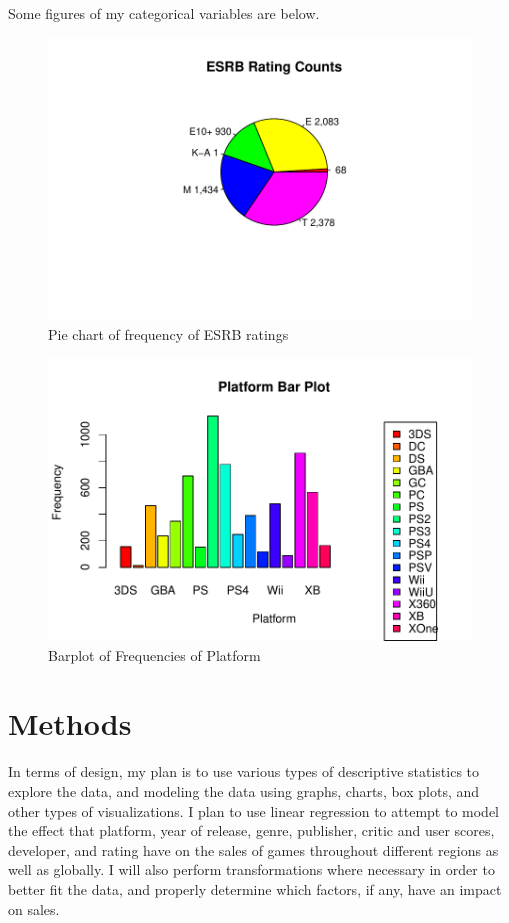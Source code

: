 \documentclass[12pt]{article}
\begin{document}
Some figures of my categorical variables are below.

\begin{figure}[tbp]
  \centering
  \includegraphics[width=\textwidth]{ESRBv2.pdf}
  \caption{Pie chart of frequency of ESRB ratings}
  \label{fig:ESRB}
\end{figure}

\begin{figure}[tbp]
  \centering
  \includegraphics[width=\textwidth]{platformbarplot.pdf}
  \caption{Barplot of Frequencies of Platform}
  \label{fig:platbar}
\end{figure}



\section{Methods}
\label{sec:meth}
In terms of design, my plan is to use various types of descriptive statistics to explore the data, and modeling the data using graphs, 
charts, box plots, and other types of visualizations. I plan to use linear regression to attempt to model the effect that platform, 
year of release, genre, publisher, critic and user scores, developer, and rating have on the sales of games throughout different regions 
as well as globally. I will also perform transformations where necessary in order to better fit the data, and properly determine which 
factors, if any, have an impact on sales.
\end{document}
